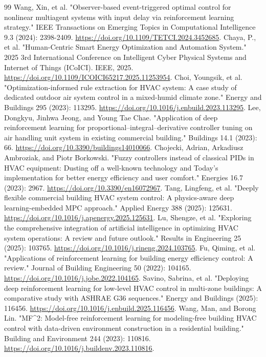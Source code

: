 \documentclass[preprint,12pt,number]{elsarticle}
\begin{document}
\begin{thebibliography}{99}
 Wang, Xin, et al. "Observer-based event-triggered optimal control for nonlinear multiagent systems with input delay via reinforcement learning strategy." IEEE Transactions on Emerging Topics in Computational Intelligence 9.3 (2024): 2398-2409. \url{https://doi.org/10.1109/TETCI.2024.3452685}.
 Chaya, P., et al. "Human-Centric Smart Energy Optimization and Automation System." 2025 3rd International Conference on Intelligent Cyber Physical Systems and Internet of Things (ICoICI). IEEE, 2025. \url{https://doi.org/10.1109/ICOICI65217.2025.11253954}.
 Choi, Youngsik, et al. "Optimization-informed rule extraction for HVAC system: A case study of dedicated outdoor air system control in a mixed-humid climate zone." Energy and Buildings 295 (2023): 113295. \url{https://doi.org/10.1016/j.enbuild.2023.113295}.
 Lee, Dongkyu, Jinhwa Jeong, and Young Tae Chae. "Application of deep reinforcement learning for proportional--integral--derivative controller tuning on air handling unit system in existing commercial building." Buildings 14.1 (2023): 66. \url{https://doi.org/10.3390/buildings14010066}.
 Chojecki, Adrian, Arkadiusz Ambroziak, and Piotr Borkowski. "Fuzzy controllers instead of classical PIDs in HVAC equipment: Dusting off a well-known technology and Today's implementation for better energy efficiency and user comfort." Energies 16.7 (2023): 2967. \url{https://doi.org/10.3390/en16072967}.
 Tang, Lingfeng, et al. "Deeply flexible commercial building HVAC system control: A physics-aware deep learning-embedded MPC approach." Applied Energy 388 (2025): 125631. \url{https://doi.org/10.1016/j.apenergy.2025.125631}.
 Lu, Shengze, et al. "Exploring the comprehensive integration of artificial intelligence in optimizing HVAC system operations: A review and future outlook." Results in Engineering 25 (2025): 103765. \url{https://doi.org/10.1016/j.rineng.2024.103765}.
 Fu, Qiming, et al. "Applications of reinforcement learning for building energy efficiency control: A review." Journal of Building Engineering 50 (2022): 104165. \url{https://doi.org/10.1016/j.jobe.2022.104165}.
 Savino, Sabrina, et al. "Deploying deep reinforcement learning for low-level HVAC control in multi-zone buildings: A comparative study with ASHRAE G36 sequences." Energy and Buildings (2025): 116456. \url{https://doi.org/10.1016/j.enbuild.2025.116456}.
 Wang, Man, and Borong Lin. "MF\textasciicircum{}2: Model-free reinforcement learning for modeling-free building HVAC control with data-driven environment construction in a residential building." Building and Environment 244 (2023): 110816. \url{https://doi.org/10.1016/j.buildenv.2023.110816}.

\end{thebibliography}
\end{document}
